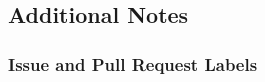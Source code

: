 \hypertarget{additional-notes}{%
\subsection{Additional Notes}\label{additional-notes}}

\hypertarget{issue-and-pull-request-labels}{%
\subsubsection{Issue and Pull Request
Labels}\label{issue-and-pull-request-labels}}
